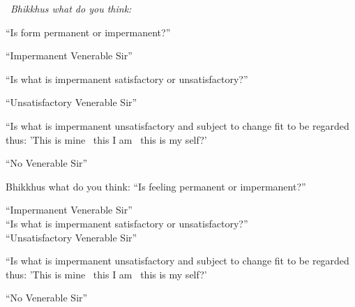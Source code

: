 \begin{english-only-leader}
  \anglebracketleft\ \hspace{-0.5mm}\textit{Bhikkhus what do you think:} \hspace{-0.5mm}\anglebracketright\
\end{english-only-leader}
  \begin{english-only-hangtogether}
    ``Is form permanent or impermanent?''
  \end{english-only-hangtogether}
  \begin{english-only-hangtogether}
  ``Impermanent Venerable Sir''
  \end{english-only-hangtogether}
  \begin{english-only-hangtogether}
  ``Is what is impermanent satisfactory or unsatisfactory?''
  \end{english-only-hangtogether}
  \begin{english-only-hangtogether}
  ``Unsatisfactory Venerable Sir''
  \end{english-only-hangtogether}
  \begin{english-only-hangtogether}
    ``Is what is impermanent unsatisfactory and subject to change fit to be regarded thus: 'This is mine \breathmark\ this I am \breathmark\ this is my self?'
  \end{english-only-hangtogether}
  \begin{english-only-hangtogether}
  ``No Venerable Sir''
  \end{english-only-hangtogether}

\begin{english-only-nohang}
  \begin{english-only-hang}
    Bhikkhus what do you think: ``Is feeling permanent or impermanent?''
  \end{english-only-hang}
  ``Impermanent Venerable Sir''\\
  ``Is what is impermanent satisfactory or unsatisfactory?''\\
  ``Unsatisfactory Venerable Sir''\\
  \begin{english-hangtogether}
    ``Is what is impermanent unsatisfactory and subject to change fit to be regarded thus: 'This is mine \breathmark\ this I am \breathmark\ this is my self?'
  \end{english-hangtogether}
  ``No Venerable Sir''
\end{english-only-nohang}

